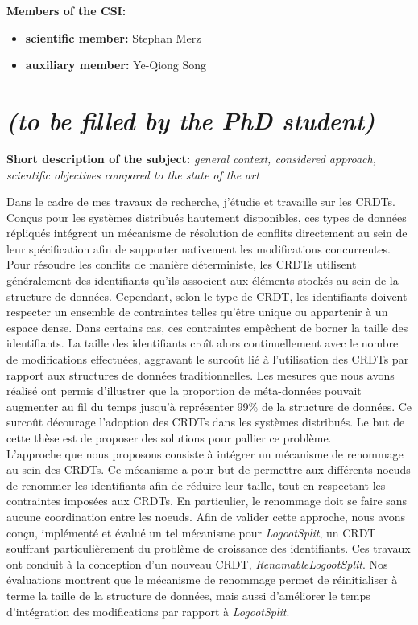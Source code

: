 \documentclass[12pt]{article}
\newcommand{\commentaire}[1]{\small\textit{#1}}
\begin{document}
\noindent\textbf{Members of the CSI:}
\begin{itemize}
\item\textbf{scientific member:}
  Stephan Merz
\item\textbf{auxiliary member:}
  Ye-Qiong Song
\end{itemize}

\newpage
\section*{ \textit{\small (to be filled by the PhD student)}}

\noindent\textbf{Short description of the subject:}
\commentaire{%
  general context, considered approach, scientific objectives
  compared to the state of the art\\}

Dans le cadre de mes travaux de recherche, j'étudie et travaille sur les \acfp{CRDT}.
Conçus pour les systèmes distribués hautement disponibles, ces types de données répliqués intégrent un mécanisme de résolution de conflits directement au sein de leur spécification afin de supporter nativement les modifications concurrentes.
Pour résoudre les conflits de manière déterministe, les \acp{CRDT} utilisent généralement des identifiants qu'ils associent aux éléments stockés au sein de la structure de données.
Cependant, selon le type de \ac{CRDT}, les identifiants doivent respecter un ensemble de contraintes telles qu'être unique ou appartenir à un espace dense.
Dans certains cas, ces contraintes empêchent de borner la taille des identifiants.
La taille des identifiants croît alors continuellement avec le nombre de modifications effectuées, aggravant le surcoût lié à l'utilisation des \acp{CRDT} par rapport aux structures de données traditionnelles.
Les mesures que nous avons réalisé ont permis d'illustrer que la proportion de méta-données pouvait augmenter au fil du temps jusqu'à représenter 99\% de la structure de données.
Ce surcoût décourage l'adoption des \acp{CRDT} dans les systèmes distribués.
Le but de cette thèse est de proposer des solutions pour pallier ce problème.
\\

L'approche que nous proposons consiste à intégrer un mécanisme de renommage au sein des \acp{CRDT}.
Ce mécanisme a pour but de permettre aux différents noeuds de renommer les identifiants afin de réduire leur taille, tout en respectant les contraintes imposées aux \acp{CRDT}.
En particulier, le renommage doit se faire sans aucune coordination entre les noeuds.
Afin de valider cette approche, nous avons conçu, implémenté et évalué un tel mécanisme pour \emph{LogootSplit}, un \ac{CRDT} souffrant particulièrement du problème de croissance des identifiants.
Ces travaux ont conduit à la conception d'un nouveau \ac{CRDT}, \emph{RenamableLogootSplit}.
Nos évaluations montrent que le mécanisme de renommage permet de réinitialiser à terme la taille de la structure de données, mais aussi d'améliorer le temps d'intégration des modifications par rapport à \emph{LogootSplit}.
\\
\end{document}
